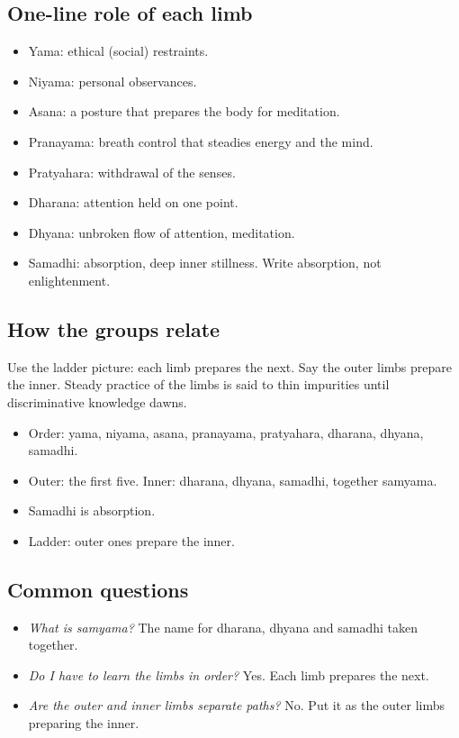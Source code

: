 \subsection*{One-line role of each limb}
\begin{itemize}
\item Yama: ethical (social) restraints.
\item Niyama: personal observances.
\item Asana: a posture that prepares the body for meditation.
\item Pranayama: breath control that steadies energy and the mind.
\item Pratyahara: withdrawal of the senses.
\item Dharana: attention held on one point.
\item Dhyana: unbroken flow of attention, meditation.
\item Samadhi: absorption, deep inner stillness. Write absorption, not enlightenment.
\end{itemize}

\subsection*{How the groups relate}
Use the ladder picture: each limb prepares the next. Say the outer limbs prepare the inner. Steady practice of the limbs is said to thin impurities until discriminative knowledge dawns.

\begin{recall}
\begin{itemize}
\item Order: yama, niyama, asana, pranayama, pratyahara, dharana, dhyana, samadhi.
\item Outer: the first five. Inner: dharana, dhyana, samadhi, together samyama.
\item Samadhi is absorption.
\item Ladder: outer ones prepare the inner.
\end{itemize}
\end{recall}

\subsection*{Common questions}
\begin{itemize}
\item \emph{What is samyama?} The name for dharana, dhyana and samadhi taken together.
\item \emph{Do I have to learn the limbs in order?} Yes. Each limb prepares the next.
\item \emph{Are the outer and inner limbs separate paths?} No. Put it as the outer limbs preparing the inner.
\end{itemize}

